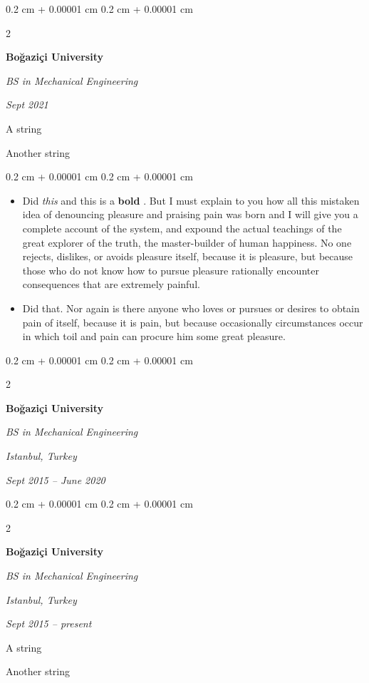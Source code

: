 \documentclass[10pt, letterpaper]{article}
\newenvironment{summary}{
    \begin{description}[
        topsep=0.10 cm,
        parsep=0.10 cm,
        partopsep=0pt,
        itemsep=0pt,
        leftmargin=0.4 cm + 10pt
    ]
}{
    \end{description}
} %
\newenvironment{highlights}{
    \begin{itemize}[
        topsep=0.10 cm,
        parsep=0.10 cm,
        partopsep=0pt,
        itemsep=0pt,
        leftmargin=0.4 cm + 10pt
    ]
}{
    \end{itemize}
} %
\newenvironment{onecolentry}{
    \begin{adjustwidth}{
        0.2 cm + 0.00001 cm
    }{
        0.2 cm + 0.00001 cm
    }
}{
    \end{adjustwidth}
} %
\newenvironment{twocolentry}[2][]{
    \onecolentry
    \def\secondColumn{#2}
    \setcolumnwidth{\fill, 4.5 cm}
    \begin{paracol}{2}
}{
    \switchcolumn \raggedleft \secondColumn
    \end{paracol}
    \endonecolentry
} %
\let\hrefWithoutArrow\href
\renewcommand{\href}[2]{\hrefWithoutArrow{#1}{\ifthenelse{\equal{#2}{}}{ }{#2 }\raisebox{.15ex}{\footnotesize \faExternalLink*}}}
\begin{document}
        \begin{twocolentry}{
            
            
        \textit{Sept 2021}}
            \textbf{Boğaziçi University}

            \textit{BS in Mechanical Engineering}
        \end{twocolentry}
            \begin{summary}
                \item A string
                \item Another string
            \end{summary}
        \vspace{0.10 cm}
        \begin{onecolentry}
            \begin{highlights}
                \item Did \textit{this} and this is a \textbf{bold} \href{https://example.com}{link}. But I must explain to you how all this mistaken idea of denouncing pleasure and praising pain was born and I will give you a complete account of the system, and expound the actual teachings of the great explorer of the truth, the master-builder of human happiness. No one rejects, dislikes, or avoids pleasure itself, because it is pleasure, but because those who do not know how to pursue pleasure rationally encounter consequences that are extremely painful.
                \item Did that. Nor again is there anyone who loves or pursues or desires to obtain pain of itself, because it is pain, but because occasionally circumstances occur in which toil and pain can procure him some great pleasure.
            \end{highlights}
        \end{onecolentry}


        \vspace{0.2 cm}

        \begin{twocolentry}{
        \textit{Istanbul, Turkey}    
            
        \textit{Sept 2015 – June 2020}}
            \textbf{Boğaziçi University}

            \textit{BS in Mechanical Engineering}
        \end{twocolentry}


        \vspace{0.2 cm}

        \begin{twocolentry}{
        \textit{Istanbul, Turkey}    
            
        \textit{Sept 2015 – present}}
            \textbf{Boğaziçi University}

            \textit{BS in Mechanical Engineering}
        \end{twocolentry}
            \begin{summary}
                \item A string
                \item Another string
            \end{summary}
\end{document}
